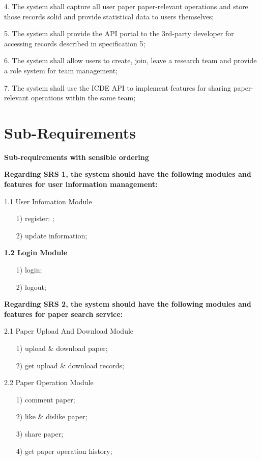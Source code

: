 \documentclass[sigconf, nonacm]{../tex_template/acmart}
\begin{document}
4. The system shall capture all user paper paper-relevant operations and store those records solid and provide statistical data to users themselves;

5. The system shall provide the API portal to the 3rd-party developer for accessing records described in specification 5;

6. The system shall allow users to create, join, leave a research team and provide a role system for team management;

7. The system shall use the ICDE API to implement features for sharing paper-relevant operations within the same team;

\section{Sub-Requirements}
\textbf{Sub-requirements with sensible ordering}

\textbf{Regarding SRS 1, the system should have the following modules and features for user information management:}

1.1 User Infomation Module
\begin{itemize}
	\item [1)]
	      register: ;
	\item [2)]
	      update information;
\end{itemize}

\textbf{1.2 Login Module}
\begin{itemize}
	\item [1)]
	      login;
	\item [2)]
	      logout;
\end{itemize}

\textbf{Regarding SRS 2, the system should have the following modules and features for paper search service:}

2.1 Paper Upload And Download Module
\begin{itemize}
	\item [1)]
	      upload \& download paper;
	\item [2)]
	      get upload \& download records;
\end{itemize}

2.2 Paper Operation Module
\begin{itemize}
	\item [1)]
	      comment paper;
	\item [2)]
	      like \& dislike paper;
	\item [3)]
	      share paper;
	\item [4)]
	      get paper operation history;
\end{itemize}
\end{document}
